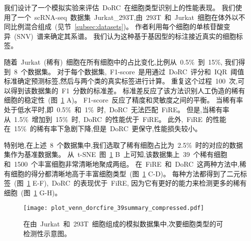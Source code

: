\label{subsec:recplanted} 
我们设计了一个模拟实验来评估~DoRC~在细胞类型识别上的性能表现。
我们使用了一个~scRNA-seq~数据集~Jurkat\_293T,由~293T~和~Jurkat~细胞在体外以不同比例混合组成~(见节~\ref{subsec:datasets})。
作者利用每个细胞的单核苷酸变异~(SNV)~谱来确定其系谱。
我们认为这种基于基因型的标注接近真实的细胞标签。

随着~Jurkat~(稀有)~细胞在所有细胞中的占比变化,比例从~0.5\%~到~15\%,
我们得到~8~个数据集。
对于每个数据集,~F1-score~是用通过~DoRC~评分和~IQR~阈值标准确定预测标签,然后与两个类的真实标签进行计算。
重复这个过程~100~次,可以得到该数据集的~F1~分数的标准差。
标准差反应了该方法识别人工伪造的稀有细胞的稳定性~(图~\ref{fig:jurkat} A)。 
F1-score~反应了精度和灵敏度之间的平衡。
当稀有率处于低水平时,即~0.5\%~和~1\%~时,~DoRC~无法匹配~FiRE。
但是,当稀有率从~1.5\%~增加到~15\%~时,~DoRC~的性能优于~FiRE。
此外,~FiRE~的性能在~15\%~的稀有率下急剧下降,但是~DoRC~更保守,性能损失较小。

特别地,在上述~8~个数据集中,我们选取了稀有细胞占比为~2.5\%~时的对应的数据集作为基准数据集。
从~t-SNE~图~\ref{fig:jurkat} B~上可知,该数据集上~39~个稀有细胞和~1500~个丰富细胞非常清晰地聚成两组。
在~FiRE~和~DoRC~这两种方法中,稀有细胞的得分都清晰地高于丰富细胞类型~(图~\ref{fig:jurkat} C-D)。
每种方法都得到了二元标签~(图~\ref{fig:jurkat} E-F),~DoRC~的表现优于~FiRE,
因为它有更好的能力来检测更多的稀有细胞~(图~\ref{fig:jurkat} G-H)。

\begin{figure}[!htbp]
    \centering
    \texttt{[image: plot\_venn\_dorcfire\_39summary\_compressed.pdf]}
    \caption{
    在由~Jurkat~和~293T~细胞组成的模拟数据集中,次要细胞类型的可检测性示意图。
    }
    \label{fig:jurkat}
\end{figure}


